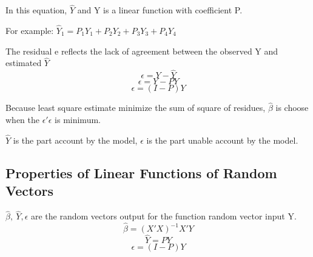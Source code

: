 \documentclass[12pt]{article}
\begin{document}
In this equation, $\hat{Y}$ and Y is a linear function with coefficient P. 

For example: $\hat{Y}_1 = P_1Y_1 + P_2Y_2 + P_3Y_3 + P_4Y_4$

The residual e reflects the lack of agreement between the observed Y and estimated $\hat{Y}$
$$\epsilon = Y - \hat{Y}$$
$$\epsilon = Y - PY$$
$$\epsilon = (I - P)Y$$

Because least square estimate minimize the sum of square  of residues, $\hat{\beta}$ is choose when the $\epsilon'\epsilon$ is minimum.

$\hat{Y}$ is the part account by the model, $\epsilon$ is the part unable account by the model.

\subsection{Properties of Linear Functions of Random Vectors}

$\hat{\beta},\ \hat{Y}, \epsilon$ are the random vectors output for the function random vector input Y. 
$$\hat{\beta} = (X'X)^{-1} X'Y$$
$$\hat{Y} = PY $$
$$\epsilon = (I - P)Y$$
\end{document}
